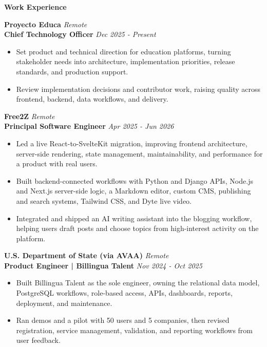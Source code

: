 \documentclass[10pt]{article}
\newcommand{\sectiontitle}[1]{%
    \vspace{4pt}
    \begin{center}
        \textbf{#1}
    \end{center}
    \vspace{-5pt}
}
\begin{document}
\sectiontitle{Work Experience}
\textbf{Proyecto Educa} \hfill \textit{Remote} \\
\textbf{Chief Technology Officer} \hfill \textit{Dec 2025 - Present}
\begin{itemize}
    \item Set product and technical direction for education platforms, turning stakeholder needs into architecture, implementation priorities, release standards, and production support.
    \item Review implementation decisions and contributor work, raising quality across frontend, backend, data workflows, and delivery.
\end{itemize}

\vspace{2pt}
\textbf{Free2Z} \hfill \textit{Remote} \\
\textbf{Principal Software Engineer} \hfill \textit{Apr 2025 - Jun 2026}
\begin{itemize}
    \item Led a live React-to-SvelteKit migration, improving frontend architecture, server-side rendering, state management, maintainability, and performance for a product with real users.
    \item Built backend-connected workflows with Python and Django APIs, Node.js and Next.js server-side logic, a Markdown editor, custom CMS, publishing and search systems, Tailwind CSS, and Dyte live video.
    \item Integrated and shipped an AI writing assistant into the blogging workflow, helping users draft posts and choose topics from high-interest activity on the platform.
\end{itemize}

\vspace{2pt}
\textbf{U.S. Department of State (via AVAA)} \hfill \textit{Remote} \\
\textbf{Product Engineer | Billingua Talent} \hfill \textit{Nov 2024 - Oct 2025}
\begin{itemize}
    \item Built Billingua Talent as the sole engineer, owning the relational data model, PostgreSQL workflows, role-based access, APIs, dashboards, reports, deployment, and maintenance.
    \item Ran demos and a pilot with 50 users and 5 companies, then revised registration, service management, validation, and reporting workflows from user feedback.
\end{itemize}
\end{document}
